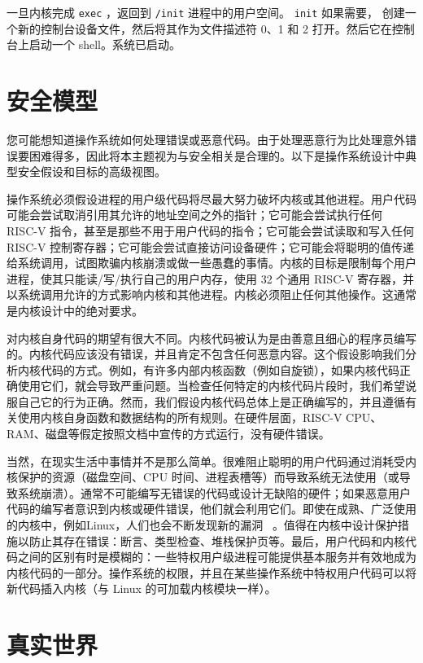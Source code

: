 一旦内核完成
    \lstinline{exec}    ，返回到   \lstinline{/init}   进程中的用户空间。
    \lstinline{init}   
 如果需要，       创建一个新的控制台设备文件，然后将其作为文件描述符 0、1 和 2 打开。然后它在控制台上启动一个 shell。系统已启动。  

   \section{安全模型  }     

您可能想知道操作系统如何处理错误或恶意代码。由于处理恶意行为比处理意外错误要困难得多，因此将本主题视为与安全相关是合理的。以下是操作系统设计中典型安全假设和目标的高级视图。  

操作系统必须假设进程的用户级代码将尽最大努力破坏内核或其他进程。用户代码可能会尝试取消引用其允许的地址空间之外的指针；它可能会尝试执行任何 RISC-V 指令，甚至是那些不用于用户代码的指令；它可能会尝试读取和写入任何 RISC-V 控制寄存器；它可能会尝试直接访问设备硬件；它可能会将聪明的值传递给系统调用，试图欺骗内核崩溃或做一些愚蠢的事情。内核的目标是限制每个用户进程，使其只能读/写/执行自己的用户内存，使用 32 个通用 RISC-V 寄存器，并以系统调用允许的方式影响内核和其他进程。内核必须阻止任何其他操作。这通常是内核设计中的绝对要求。  

对内核自身代码的期望有很大不同。内核代码被认为是由善意且细心的程序员编写的。内核代码应该没有错误，并且肯定不包含任何恶意内容。这个假设影响我们分析内核代码的方式。例如，有许多内部内核函数（例如自旋锁），如果内核代码正确使用它们，就会导致严重问题。当检查任何特定的内核代码片段时，我们希望说服自己它的行为正确。然而，我们假设内核代码总体上是正确编写的，并且遵循有关使用内核自身函数和数据结构的所有规则。在硬件层面，RISC-V CPU、RAM、磁盘等假定按照文档中宣传的方式运行，没有硬件错误。  

当然，在现实生活中事情并不是那么简单。很难阻止聪明的用户代码通过消耗受内核保护的资源（磁盘空间、CPU 时间、进程表槽等）而导致系统无法使用（或导致系统崩溃）。通常不可能编写无错误的代码或设计无缺陷的硬件；如果恶意用户代码的编写者意识到内核或硬件错误，他们就会利用它们。即使在成熟、广泛使用的内核中，例如Linux，人们也会不断发现新的漏洞~    \cite{mitre:cves}    。值得在内核中设计保护措施以防止其存在错误：断言、类型检查、堆栈保护页等。最后，用户代码和内核代码之间的区别有时是模糊的：一些特权用户级进程可能提供基本服务并有效地成为内核代码的一部分。操作系统的权限，并且在某些操作系统中特权用户代码可以将新代码插入内核（与 Linux 的可加载内核模块一样）。
    \section{真实世界  }     

